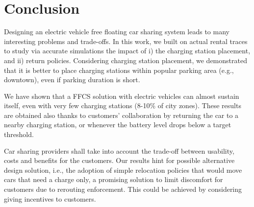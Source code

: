 \section{Conclusion}
\label{sec:conclusion}

Designing an electric vehicle free floating car sharing system leads to many interesting problems and trade-offs.
In this work, we built on actual rental traces to study via accurate simulations the impact of i) the charging station placement, and ii) return policies. 
Considering charging station placement, we demonstrated that it is better to place charging stations within popular parking area (e.g., downtown), even if parking duration is short.

We have shown that a FFCS solution with electric vehicles can almost sustain itself, even with very few charging stations (8-10\% of city zones). These results are obtained also thanks to customers' collaboration by returning the car to a nearby charging station, or whenever the battery level drops below a target threshold.

Car sharing providers shall take into account the trade-off between usability, costs and benefits for the customers. 
Our results hint for possible alternative design solution, i.e.,  the adoption of simple relocation policies that would move cars that need a charge only, a promising solution to limit discomfort for customers due to rerouting enforcement. This could be achieved by considering giving incentives to customers.

